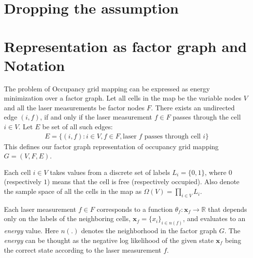 \documentclass[letterpaper, 10 pt, conference]{ieeeconf} %
\newcommand{\vect}[1]{\mathbf{#1}}
\newcommand{\field}[1]{\mathbb{#1}}
\newcommand{\Real}[0]{\field{R}}
\begin{document}
\section{Dropping the assumption}

\section{Representation as factor graph and Notation}
\label{sec:notation}
The problem of Occupancy grid mapping can be expressed as energy minimization
over a factor graph. Let all cells in the map be the variable nodes $V$ and all
the laser measurements be factor nodes $F$. 
There
exists an undirected edge $(i, f)$, if and only if the laser
measurement $f \in F$ passes through the cell $i \in V$. Let $E$ be set of all such edges:
\begin{align}
  E = \{(i, f) : i \in V, f \in F, \text{laser $f$ passes through cell $i$}\}
\end{align}
This defines our factor graph representation of occupancy grid mapping $G = (V, F, E)$.

%
%
Each cell $i \in V$ takes values
from a discrete set of labels $L_i = \{0, 1\}$, where $0$ (respectively $1$) means that
the cell is free (respectively occupied). Also denote the sample space of all the
cells in the map as $\Omega(V) = \prod_{i \in V} L_i$.

Each laser measurement $f \in F$ corresponds to a function $\theta_f : \vect{x}_f \rightarrow \Real$ 
that depends only on the labels of the neighboring cells, $\vect{x}_f = \{x_i\}_{i
\in n(f)}$, and evaluates to an
\emph{energy} value. Here $n(.)$ denotes the neighborhood in the factor graph $G$.
The \emph{energy} can be thought as the negative log likelihood of the given
state $\vect{x}_f$ being the correct state according to the laser measurement $f$.
\end{document}
